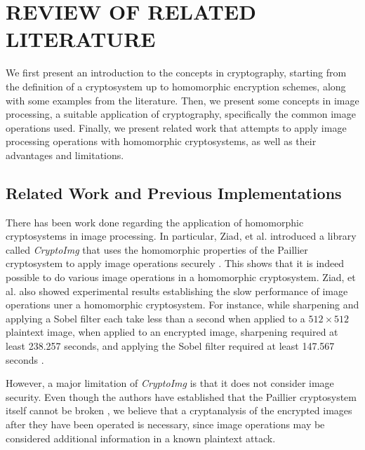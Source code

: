 \chapter{REVIEW OF RELATED LITERATURE}

We first present an introduction to the concepts in cryptography, starting from the definition of a cryptosystem up to homomorphic encryption schemes, along with some examples from the literature. Then, we present some concepts in image processing, a suitable application of cryptography, specifically the common image operations used. Finally, we present related work that attempts to apply image processing operations with homomorphic cryptosystems, as well as their advantages and limitations.




\section{Related Work and Previous Implementations}




There has been work done regarding the application of homomorphic cryptosystems in image processing. In particular, Ziad, et al. introduced a library called \textit{CryptoImg} that uses the homomorphic properties of the Paillier cryptosystem to apply image operations securely \cite{ziad_cryptoimg:_2016}. This shows that it is indeed possible to do various image operations in a homomorphic cryptosystem. Ziad, et al. also showed experimental results establishing the slow performance of image operations uner a homomorphic cryptosystem. For instance, while sharpening and applying a Sobel filter each take less than a second when applied to a $512\times 512$ plaintext image, when applied to an encrypted image, sharpening required at least 238.257 seconds, and applying the Sobel filter required at least 147.567 seconds \cite{ziad_cryptoimg:_2016}.

However, a major limitation of \textit{CryptoImg} is that it does not consider image security. Even though the authors have established that the Paillier cryptosystem itself cannot be broken \cite{ziad_cryptoimg:_2016}, we believe that a cryptanalysis of the encrypted images after they have been operated is necessary, since image operations may be considered additional information in a known plaintext attack.

